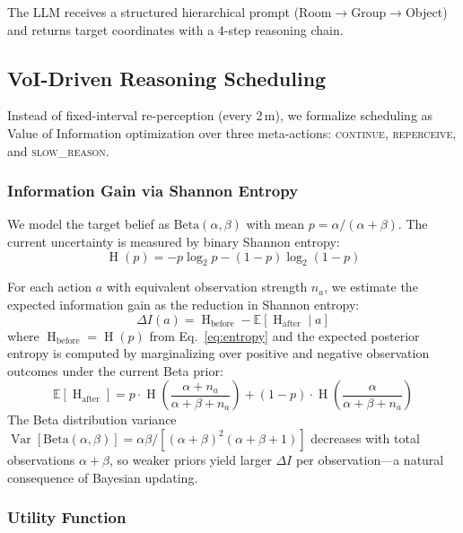 \documentclass[conference]{IEEEtran}
\DeclareMathOperator{\Var}{Var}
\DeclareMathOperator{\Entropy}{H}
\begin{document}
The LLM receives a structured hierarchical prompt (Room$\to$Group$\to$Object) and returns target coordinates with a 4-step reasoning chain.

\subsection{VoI-Driven Reasoning Scheduling}
\label{sec:voi}

Instead of fixed-interval re-perception (every 2\,m), we formalize scheduling as Value of Information optimization over three meta-actions: \textsc{continue}, \textsc{reperceive}, and \textsc{slow\_reason}.

\subsubsection{Information Gain via Shannon Entropy}

We model the target belief as $\text{Beta}(\alpha, \beta)$ with mean $p = \alpha/(\alpha+\beta)$.
The current uncertainty is measured by binary Shannon entropy:
\begin{equation}
\Entropy(p) = -p \log_2 p - (1{-}p) \log_2(1{-}p)
\label{eq:entropy}
\end{equation}

For each action $a$ with equivalent observation strength $n_a$, we estimate the expected information gain as the reduction in Shannon entropy:
\begin{equation}
\Delta I(a) = \Entropy_{\text{before}} - \mathbb{E}\!\left[\Entropy_{\text{after}} \mid a\right]
\label{eq:infogain}
\end{equation}
where $\Entropy_{\text{before}} = \Entropy(p)$ from Eq.~\eqref{eq:entropy} and the expected posterior entropy is computed by marginalizing over positive and negative observation outcomes under the current Beta prior:
\begin{equation}
\mathbb{E}[\Entropy_{\text{after}}] = p \cdot \Entropy\!\left(\frac{\alpha + n_a}{\alpha + \beta + n_a}\right) + (1{-}p) \cdot \Entropy\!\left(\frac{\alpha}{\alpha + \beta + n_a}\right)
\end{equation}
The Beta distribution variance $\Var[\text{Beta}(\alpha,\beta)] = \alpha\beta / [(\alpha{+}\beta)^2(\alpha{+}\beta{+}1)]$ decreases with total observations $\alpha{+}\beta$, so weaker priors yield larger $\Delta I$ per observation---a natural consequence of Bayesian updating.

\subsubsection{Utility Function}
\end{document}
